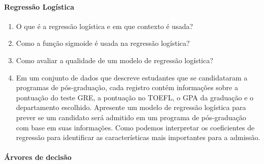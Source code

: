 \documentclass{article}
\begin{document}
    \paragraph{Regressão Logística}

    \begin{enumerate}
        \item O que é a regressão logística e em que contexto é usada?

        \item Como a função sigmoide é usada na regressão logística?

        \item Como avaliar a qualidade de um modelo de regressão logística?

        \item Em um conjunto de dados que descreve estudantes que se candidataram a programas de pós-graduação, cada registro contém informações sobre a pontuação do teste GRE, a pontuação no TOEFL, o GPA da graduação e o departamento escolhido. Apresente um modelo de regressão logística para prever se um candidato será admitido em um programa de pós-graduação com base em suas informações. Como podemos interpretar os coeficientes de regressão para identificar as características mais importantes para a admissão.

    \end{enumerate}

    \paragraph{Árvores de decisão}
\end{document}

